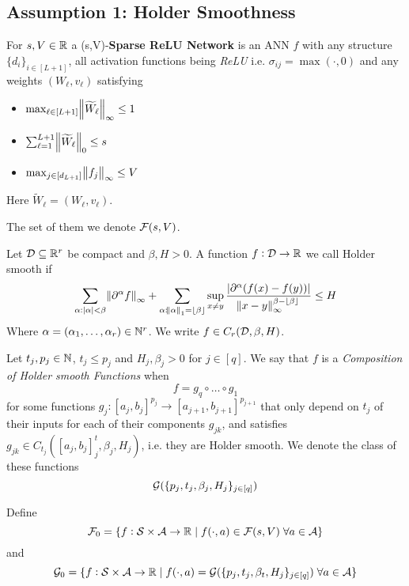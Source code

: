 
\subsection{Assumption 1: Holder Smoothness} %

\begin{defn}
	For $s,V \in \mathbb{R}$ a (s,V)-\textbf{Sparse ReLU Network} is an ANN $f$
	with any structure $\{d_i\}_{i\in [L+1]}$,
	all activation functions being \emph{ReLU} i.e. $\sigma_{ij} = \max(\cdot, 0)$
	and any weights $(W_\ell, v_\ell)$
	satisfying
	\begin{itemize}
		\item $\max_{\ell \in [L+1]} \norm{\widetilde{W}_\ell}_\infty \leq 1$
		\item $\sum_{\ell = 1}^{L+1} \norm{\widetilde{W}_\ell}_0 \leq s$
		\item $\max_{j \in [d_{L+1}]} \norm{f_j}_\infty \leq V$
	\end{itemize}
	Here $\widetilde{W}_\ell = (W_\ell, v_\ell)$.
	
	The set of them we denote $\mathcal{F}(s,V)$.
\end{defn}

\begin{defn}
	Let $\mathcal{D}\subseteq \mathbb{R}^r$ be compact and $\beta,H>0$. A function $f:\mathcal{D}\to \mathbb{R}$
	we call Holder smooth if
	\[ \sum_{{\alpha} : |{\alpha}| < \beta}
		\norm{\partial^{\alpha}f}_\infty +
		\sum_{{\alpha} : \norm{{\alpha}}_1 = \lfloor\beta\rfloor}
		\sup_{x \neq y} \frac{|\partial^\alpha (f(x) - f(y))|}
		{\norm{x-y}_\infty^{\beta-\lfloor\beta\rfloor}} \leq H \] 
	Where $\alpha = (\alpha_1, \dots, \alpha_r) \in \mathbb{N}^r$.
	We write $f \in C_r(\mathcal{D}, \beta, H)$.
\end{defn}

\begin{defn}
	Let $t_j, p_j \in \mathbb{N}$, $t_j\leq p_j$ and $H_j, \beta_j > 0$ for $j \in [q]$.
	We say that $f$ is a \emph{Composition of Holder smooth Functions} when
	\[ f = g_q \circ \dots \circ g_1 \]
	for some functions $g_j : [a_j, b_j]^{p_j} \to [a_{j+1}, b_{j+1}]^{p_{j+1}}$
	that only depend on $t_j$ of their inputs
	for each of their components $g_{jk}$,
	and satisfies $g_{jk} \in C_{t_j}([a_j, b_j]^t_j, \beta_j, H_j)$, 
	i.e. they are Holder smooth.
	We denote the class of these functions
	\[ \mathcal{G}(\{p_j, t_j, \beta_j, H_j\}_{j \in [q]}) \]
\end{defn}

\begin{defn}
	Define
	\[ \mathcal{F}_0 = \{ f : \mathcal{S} \times \mathcal{A} \to \mathbb{R}
	\mid f(\cdot, a) \in \mathcal{F}(s, V) \; \forall a \in \mathcal{A} \} \]
	and
	\[ \mathcal{G}_0 = \{ f : \mathcal{S} \times \mathcal{A} \to \mathbb{R}
	\mid f(\cdot, a) = \mathcal{G}(\{p_j, t_j, \beta_t, H_j\}_{j \in [q]})
	\; \forall a \in \mathcal{A} \} \]
\end{defn}

